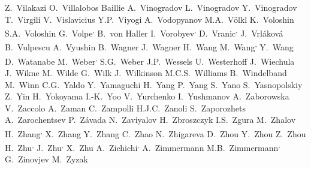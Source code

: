 \begin{flushleft}
Z.~Vilakazi\And
O.~Villalobos Baillie\And
A.~Vinogradov\And
L.~Vinogradov\And
Y.~Vinogradov\And
T.~Virgili\And
V.~Vislavicius\And
Y.P.~Viyogi\And
A.~Vodopyanov\And
M.A.~V\"{o}lkl\And
K.~Voloshin\And
S.A.~Voloshin\And
G.~Volpe\textsuperscript{,}\And
B.~von Haller\And
I.~Vorobyev\textsuperscript{,}\And
D.~Vranic\textsuperscript{,}\And
J.~Vrl\'{a}kov\'{a}\And
B.~Vulpescu\And
A.~Vyushin\And
B.~Wagner\And
J.~Wagner\And
H.~Wang\And
M.~Wang\textsuperscript{,}\And
Y.~Wang\And
D.~Watanabe\And
M.~Weber\textsuperscript{,}\And
S.G.~Weber\And
J.P.~Wessels\And
U.~Westerhoff\And
J.~Wiechula\And
J.~Wikne\And
M.~Wilde\And
G.~Wilk\And
J.~Wilkinson\And
M.C.S.~Williams\And
B.~Windelband\And
M.~Winn\And
C.G.~Yaldo\And
Y.~Yamaguchi\And
H.~Yang\And
P.~Yang\And
S.~Yano\And
S.~Yasnopolskiy\And
Z.~Yin\And
H.~Yokoyama\And
I.-K.~Yoo\And
V.~Yurchenko\And
I.~Yushmanov\And
A.~Zaborowska\And
V.~Zaccolo\And
A.~Zaman\And
C.~Zampolli\And
H.J.C.~Zanoli\And
S.~Zaporozhets\And
A.~Zarochentsev\And
P.~Z\'{a}vada\And
N.~Zaviyalov\And
H.~Zbroszczyk\And
I.S.~Zgura\And
M.~Zhalov\And
H.~Zhang\textsuperscript{,}\And
X.~Zhang\And
Y.~Zhang\And
C.~Zhao\And
N.~Zhigareva\And
D.~Zhou\And
Y.~Zhou\And
Z.~Zhou\And
H.~Zhu\textsuperscript{,}\And
J.~Zhu\textsuperscript{,}\And
X.~Zhu\And
A.~Zichichi\textsuperscript{,}\And
A.~Zimmermann\And
M.B.~Zimmermann\textsuperscript{,}\And
G.~Zinovjev\And
M.~Zyzak
\renewcommand\labelenumi{\textsuperscript{\theenumi}~}


\end{flushleft}
